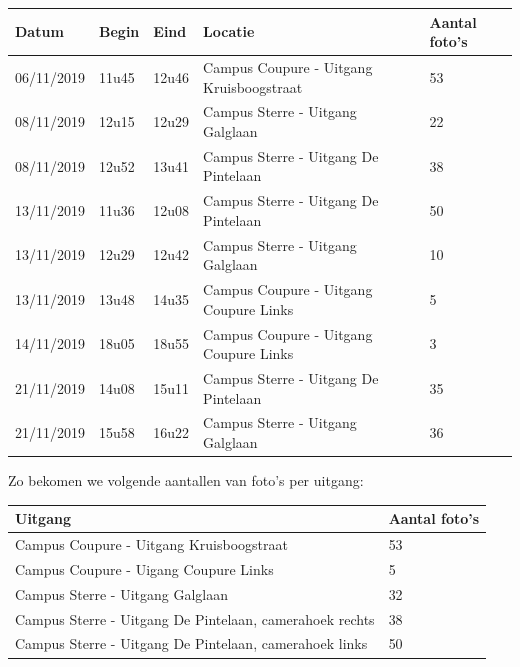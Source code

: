 \begin{table}[h]
\centering
\begin{tabular}{l|l|l|l|l}
	Datum 		& Begin & Eind	& Locatie	& Aantal foto's \\ \hline
	06/11/2019	& 11u45 & 12u46	& Campus Coupure - Uitgang Kruisboogstraat	& 53	\\
	08/11/2019	& 12u15 & 12u29	& Campus Sterre - Uitgang Galglaan	& 22	\\
	08/11/2019	& 12u52 & 13u41	& Campus Sterre - Uitgang De Pintelaan	& 38	\\
	13/11/2019	& 11u36 & 12u08	& Campus Sterre - Uitgang De Pintelaan	& 50	\\
	13/11/2019	& 12u29 & 12u42	& Campus Sterre - Uitgang Galglaan	& 10	\\
	13/11/2019	& 13u48 & 14u35	& Campus Coupure - Uitgang Coupure Links	& 5	\\
	14/11/2019	& 18u05 & 18u55	& Campus Coupure - Uitgang Coupure Links	& 3	\\
	21/11/2019	& 14u08 & 15u11	& Campus Sterre - Uitgang De Pintelaan	& 35	\\
	21/11/2019	& 15u58 & 16u22	& Campus Sterre - Uitgang Galglaan	& 36	\\
\end{tabular}
\end{table}

Zo bekomen we volgende aantallen van foto's per uitgang:
\begin{table}[h]
	\centering
	\begin{tabular}{l|l}
		Uitgang	& Aantal foto's \\ \hline
		Campus Coupure - Uitgang Kruisboogstraat	& 53\\
		Campus Coupure - Uigang Coupure Links	& 5\\
		Campus Sterre - Uitgang Galglaan	& 32\\
		Campus Sterre - Uitgang De Pintelaan, camerahoek rechts	& 38\\
		Campus Sterre - Uitgang De Pintelaan, camerahoek links	& 50\\
	\end{tabular}
\end{table}


